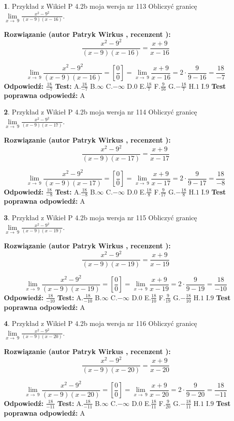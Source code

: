 \documentclass[12pt, a4paper]{article}
\theoremstyle{definition} %
\newtheorem{zad}{}
\newcommand{\zadStart}[1]{\begin{zad}#1\newline}
\newcommand{\zadStop}{\end{zad}}
\newcommand{\rozwStart}[2]{\noindent \textbf{Rozwiązanie (autor #1 , recenzent #2): }\newline}
\newcommand{\rozwStop}{\newline}
\newcommand{\odpStart}{\noindent \textbf{Odpowiedź:}\newline}
\newcommand{\odpStop}{\newline}
\newcommand{\testStart}{\noindent \textbf{Test:}\newline}
\newcommand{\testStop}{\newline}
\newcommand{\kluczStart}{\noindent \textbf{Test poprawna odpowiedź:}\newline}
\newcommand{\kluczStop}{\newline}
\begin{document}
\zadStart{Przykład z Wikieł P 4.2b moja wersja nr 113}
Obliczyć granicę $\lim\limits_{x\to\ 9}\frac{x^{2}-9^{2}}{(x-9)(x-16)}$.
\zadStop
\rozwStart{Patryk Wirkus}{}
$$\frac{x^{2}-9^{2}}{(x-9)(x-16)}=\frac{x+9}{x-16}$$

$$\lim\limits_{x\to\ 9}\frac{x^{2}-9^{2}}{(x-9)(x-16)}=[\frac{0}{0}]=\lim\limits_{x\to\ 9}\frac{x+9}{x-16}=2 \cdot \frac{9}{9-16} = \frac{18}{-7}$$
\rozwStop
\odpStart
$\frac{18}{-7}$
\odpStop
\testStart
A.$\frac{18}{-7}$
B.$\infty$
C.$-\infty$
D.$0$
E.$\frac{18}{7}$
F.$\frac{9}{16}$
G.$-\frac{18}{7}$
H.$1$
I.$9$
\testStop
\kluczStart
A
\kluczStop



\zadStart{Przykład z Wikieł P 4.2b moja wersja nr 114}
Obliczyć granicę $\lim\limits_{x\to\ 9}\frac{x^{2}-9^{2}}{(x-9)(x-17)}$.
\zadStop
\rozwStart{Patryk Wirkus}{}
$$\frac{x^{2}-9^{2}}{(x-9)(x-17)}=\frac{x+9}{x-17}$$

$$\lim\limits_{x\to\ 9}\frac{x^{2}-9^{2}}{(x-9)(x-17)}=[\frac{0}{0}]=\lim\limits_{x\to\ 9}\frac{x+9}{x-17}=2 \cdot \frac{9}{9-17} = \frac{18}{-8}$$
\rozwStop
\odpStart
$\frac{18}{-8}$
\odpStop
\testStart
A.$\frac{18}{-8}$
B.$\infty$
C.$-\infty$
D.$0$
E.$\frac{18}{8}$
F.$\frac{9}{17}$
G.$-\frac{18}{8}$
H.$1$
I.$9$
\testStop
\kluczStart
A
\kluczStop



\zadStart{Przykład z Wikieł P 4.2b moja wersja nr 115}
Obliczyć granicę $\lim\limits_{x\to\ 9}\frac{x^{2}-9^{2}}{(x-9)(x-19)}$.
\zadStop
\rozwStart{Patryk Wirkus}{}
$$\frac{x^{2}-9^{2}}{(x-9)(x-19)}=\frac{x+9}{x-19}$$

$$\lim\limits_{x\to\ 9}\frac{x^{2}-9^{2}}{(x-9)(x-19)}=[\frac{0}{0}]=\lim\limits_{x\to\ 9}\frac{x+9}{x-19}=2 \cdot \frac{9}{9-19} = \frac{18}{-10}$$
\rozwStop
\odpStart
$\frac{18}{-10}$
\odpStop
\testStart
A.$\frac{18}{-10}$
B.$\infty$
C.$-\infty$
D.$0$
E.$\frac{18}{10}$
F.$\frac{9}{19}$
G.$-\frac{18}{10}$
H.$1$
I.$9$
\testStop
\kluczStart
A
\kluczStop



\zadStart{Przykład z Wikieł P 4.2b moja wersja nr 116}
Obliczyć granicę $\lim\limits_{x\to\ 9}\frac{x^{2}-9^{2}}{(x-9)(x-20)}$.
\zadStop
\rozwStart{Patryk Wirkus}{}
$$\frac{x^{2}-9^{2}}{(x-9)(x-20)}=\frac{x+9}{x-20}$$

$$\lim\limits_{x\to\ 9}\frac{x^{2}-9^{2}}{(x-9)(x-20)}=[\frac{0}{0}]=\lim\limits_{x\to\ 9}\frac{x+9}{x-20}=2 \cdot \frac{9}{9-20} = \frac{18}{-11}$$
\rozwStop
\odpStart
$\frac{18}{-11}$
\odpStop
\testStart
A.$\frac{18}{-11}$
B.$\infty$
C.$-\infty$
D.$0$
E.$\frac{18}{11}$
F.$\frac{9}{20}$
G.$-\frac{18}{11}$
H.$1$
I.$9$
\testStop
\kluczStart
A
\kluczStop
\end{document}
